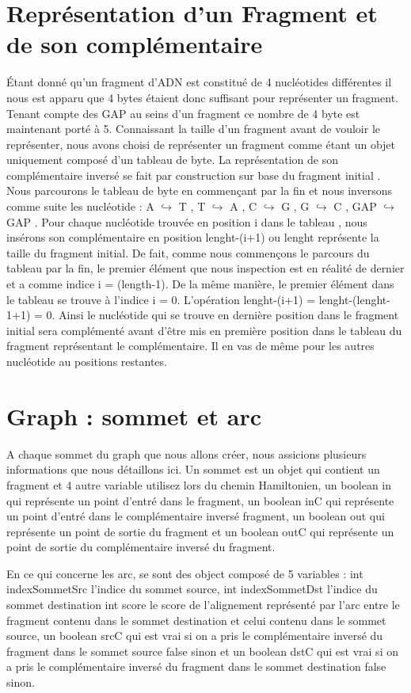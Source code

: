 \documentclass[a4paper]{article}
\begin{document}
\section{Représentation d'un Fragment et de son complémentaire}
\'Etant donné qu'un fragment d'ADN est constitué de 4 nucléotides différentes il nous est apparu que 4 bytes étaient donc suffisant pour représenter un fragment. Tenant compte des GAP au seins d'un fragment ce nombre de 4 byte est maintenant porté à 5. Connaissant la taille d'un fragment avant de vouloir le représenter, nous avons choisi de représenter un fragment comme étant un objet uniquement composé d'un tableau de byte. La représentation de son complémentaire inversé se fait par construction sur base du fragment initial . Nous parcourons le tableau de byte en commençant par la fin et nous inversons comme suite les nucléotide : A $\hookrightarrow$ T , T $\hookrightarrow$ A , C $\hookrightarrow$ G , G $\hookrightarrow$ C , GAP $\hookrightarrow$ GAP . Pour chaque nucléotide trouvée en position i dans le tableau , nous insérons son complémentaire en position lenght-(i+1) ou lenght représente la taille du fragment initial. De fait, comme nous commençons le parcours du tableau par la fin, le premier élément que nous inspection est en réalité de dernier et a comme indice i = (length-1). De la même manière, le premier élément dans le tableau se trouve à l'indice i = 0. L'opération  lenght-(i+1) = lenght-(lenght-1+1) =  0. Ainsi le nucléotide qui se trouve en dernière position dans le fragment initial sera complémenté avant d'être mis en première position dans le tableau du fragment représentant le complémentaire. Il en vas de même pour les autres nucléotide au positions restantes.  
\section{Graph : sommet et arc}

A chaque sommet du graph que nous allons créer, nous assicions plusieurs informations que nous détaillons ici. 
Un sommet est un objet qui contient un fragment et 4 autre variable utilisez lors du chemin Hamiltonien, un boolean in qui représente un point d'entré dans le fragment, un boolean inC qui représente un point d'entré dans le complémentaire inversé fragment, un boolean out qui représente un point de sortie du fragment et un boolean outC qui représente un point de sortie du complémentaire inversé du fragment. 

En ce qui concerne les arc, se sont des object composé de 5 variables : int indexSommetSrc l'indice du sommet source, int indexSommetDst l'indice du sommet destination int score le score de l'alignement représenté par l'arc entre le fragment contenu dans le sommet destination et celui contenu dans le sommet source, un boolean srcC qui est vrai si on a pris le complémentaire inversé du fragment dans le sommet source false sinon et un boolean dstC qui est vrai si on a pris le complémentaire inversé du fragment dans le sommet destination false sinon. 
\end{document}
